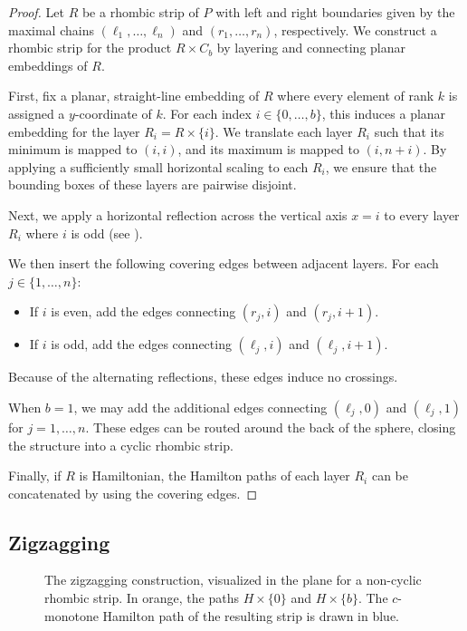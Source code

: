 \documentclass[fontsize=11pt,a4paper,DIV=12]{scrartcl}
\begin{document}
\unfolding*
\begin{proof}
Let $R$ be a rhombic strip of $P$ with left and right boundaries given by the maximal chains $(\ell_1, \ldots, \ell_n)$ and $(r_1, \ldots, r_n)$, respectively. We construct a rhombic strip for the product $R \times C_b$ by layering and connecting planar embeddings of $R$.

First, fix a planar, straight-line embedding of $R$ where every element of rank $k$ is assigned a $y$-coordinate of $k$. For each index $i \in \{0, \ldots, b\}$, this induces a planar embedding for the layer $R_i = R \times \{i\}$. We translate each layer $R_i$ such that its minimum is mapped to $(i, i)$, and its maximum is mapped to $(i, n+i)$. By applying a sufficiently small horizontal scaling to each $R_i$, we ensure that the bounding boxes of these layers are pairwise disjoint. 

Next, we apply a horizontal reflection across the vertical axis $x=i$ to every layer $R_i$ where $i$ is odd (see ).

We then insert the following covering edges between adjacent layers. For each $j \in \{1, \ldots, n\}$:
\begin{itemize}
    \item If $i$ is even, add the edges connecting $(r_j, i)$ and $(r_j, i+1)$.
    \item If $i$ is odd, add the edges connecting $(\ell_j, i)$ and $(\ell_j, i+1)$.
\end{itemize}

Because of the alternating reflections, these edges induce no crossings.

When $b=1$, we may add the additional edges connecting $(\ell_j, 0)$ and $(\ell_j, 1)$ for $j = 1, \ldots, n$. These edges can be routed around the back of the sphere, closing the structure into a cyclic rhombic strip.

Finally, if $R$ is Hamiltonian, the Hamilton paths of each layer $R_i$ can be concatenated by using the covering edges.
\end{proof}

\subsection{Zigzagging}

\begin{figure}[!ht]
    \centering
    
    \caption{The zigzagging construction, visualized in the plane for a non-cyclic rhombic strip. In orange, the paths $H\times\{0\}$ and $H\times\{b\}$. The $c$-monotone Hamilton path of the resulting strip is drawn in blue.}
    \label{fig:zigzagging}
\end{figure}
\end{document}

